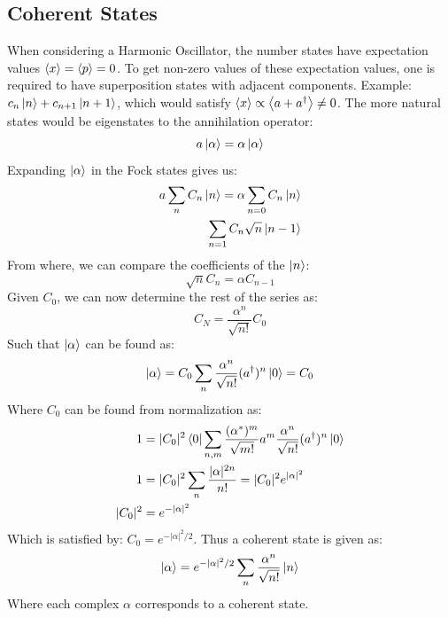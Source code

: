 \subsection{Coherent States}
When considering a Harmonic Oscillator, the number states have expectation values $\expval{x} = \expval{p} = 0$. To get non-zero values of these expectation values, one is required to have superposition states with adjacent components. Example: $c_n\ket{n} + c_{n+1} \ket{n+1}$, which would satisfy $\expval{x} \propto \expval{a + a^\dagger} \neq 0$. The more natural states would be eigenstates to the annihilation operator:
\begin{equation}
    a \ket{\alpha} = \alpha \ket{\alpha}
\end{equation}
Expanding $\ket{\alpha}$ in the Fock states gives us:
\begin{align}
    a \sum_n C_n \ket{n} = \alpha \sum_{n = 0} C_n \ket{n} \\
    \sum_{n = 1} C_n \sqrt{n} \ket{n - 1}
\end{align}
From where, we can compare the coefficients of the $\ket{n}$:
\begin{equation}
    \sqrt{n} C_n = \alpha C_{n - 1}
\end{equation}
Given $C_0$, we can now determine the rest of the series as:
\begin{equation}
    C_N = \frac{\alpha^n}{\sqrt{n!}} C_0 
\end{equation}
Such that $\ket{\alpha}$ can be found as: 
\begin{equation}
    \ket{\alpha} = C_0 \sum_n \frac{\alpha^n} {\sqrt{n!}} (a^\dagger)^n \ket{0} = C_0
\end{equation}
Where $C_0$ can be found from normalization as:
\begin{align}
    1 &= |C_0|^2 \bra{0}\sum_{n, m}\frac{(\alpha^*)^m} {\sqrt{m!}} a^m \frac{\alpha^n} {\sqrt{n!}} (a^\dagger)^n \ket{0} \\
    1 &= |C_0|^2 \sum_n \frac{|\alpha|^{2n} }{n!} = |C_0|^2 e^{|\alpha|^2} \\
    |C_0|^2 &= e^{-|\alpha|^2}
\end{align}
Which is satisfied by: $C_0 = e^{- |\alpha|^2 / 2}$. Thus a coherent state is given as:
\begin{equation}
    \ket{\alpha} = e^{-|\alpha|^2 / 2} \sum_n \frac{\alpha^n}{\sqrt{n!}} \ket{n}
\end{equation}
Where each complex $\alpha$ corresponds to a coherent state.


